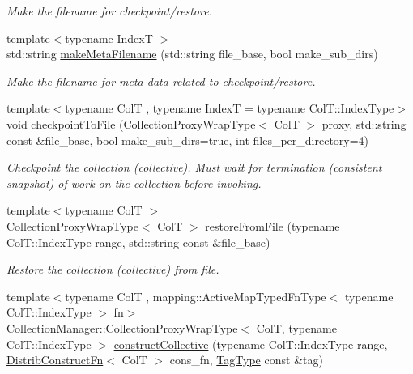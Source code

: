 \begin{DoxyCompactItemize}
\begin{DoxyCompactList}\small\item\em Make the filename for checkpoint/restore. \end{DoxyCompactList}\item 
{\footnotesize template$<$typename IndexT $>$ }\\std\+::string \hyperlink{structvt_1_1vrt_1_1collection_1_1_collection_manager_abe41e7e9c9dec081a79b222b4c5dc199}{make\+Meta\+Filename} (std\+::string file\+\_\+base, bool make\+\_\+sub\+\_\+dirs)
\begin{DoxyCompactList}\small\item\em Make the filename for meta-\/data related to checkpoint/restore. \end{DoxyCompactList}\item 
{\footnotesize template$<$typename ColT , typename IndexT  = typename Col\+T\+::\+Index\+Type$>$ }\\void \hyperlink{structvt_1_1vrt_1_1collection_1_1_collection_manager_af3771d408c2ef15e65b9ba8219aa830a}{checkpoint\+To\+File} (\hyperlink{structvt_1_1vrt_1_1collection_1_1_collection_manager_a56458ed7f9bb22b631b9b3a745f42f94}{Collection\+Proxy\+Wrap\+Type}$<$ ColT $>$ proxy, std\+::string const \&file\+\_\+base, bool make\+\_\+sub\+\_\+dirs=true, int files\+\_\+per\+\_\+directory=4)
\begin{DoxyCompactList}\small\item\em Checkpoint the collection (collective). Must wait for termination (consistent snapshot) of work on the collection before invoking. \end{DoxyCompactList}\item 
{\footnotesize template$<$typename ColT $>$ }\\\hyperlink{structvt_1_1vrt_1_1collection_1_1_collection_manager_a56458ed7f9bb22b631b9b3a745f42f94}{Collection\+Proxy\+Wrap\+Type}$<$ ColT $>$ \hyperlink{structvt_1_1vrt_1_1collection_1_1_collection_manager_a315a74b9299f31ebc5e3e4becdd9f79e}{restore\+From\+File} (typename Col\+T\+::\+Index\+Type range, std\+::string const \&file\+\_\+base)
\begin{DoxyCompactList}\small\item\em Restore the collection (collective) from file. \end{DoxyCompactList}\item 
{\footnotesize template$<$typename ColT , mapping\+::\+Active\+Map\+Typed\+Fn\+Type$<$ typename Col\+T\+::\+Index\+Type $>$ fn$>$ }\\\hyperlink{structvt_1_1vrt_1_1collection_1_1_collection_manager_a56458ed7f9bb22b631b9b3a745f42f94}{Collection\+Manager\+::\+Collection\+Proxy\+Wrap\+Type}$<$ ColT, typename Col\+T\+::\+Index\+Type $>$ \hyperlink{structvt_1_1vrt_1_1collection_1_1_collection_manager_a9b376e8e7145bf3d0f6b268d7974f783}{construct\+Collective} (typename Col\+T\+::\+Index\+Type range, \hyperlink{structvt_1_1vrt_1_1collection_1_1_collection_manager_a7503830bc133013d542856fa39834dcc}{Distrib\+Construct\+Fn}$<$ ColT $>$ cons\+\_\+fn, \hyperlink{namespacevt_a84ab281dae04a52a4b243d6bf62d0e52}{Tag\+Type} const \&tag)
\end{DoxyCompactItemize}
